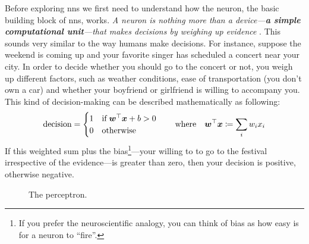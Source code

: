 Before exploring \glspl{nn} we first need to understand how the neuron, the
basic building block of \glspl{nn}, works.  \emph{A neuron is nothing more than
a device---\textbf{a simple computational unit}---that makes decisions by weighing up
evidence} \parencite{Nielsen2018}. This sounds very similar to the way humans
make decisions. For instance, suppose the weekend is coming up and your favorite
singer has scheduled a concert near your city. In order to decide whether you
should go to the concert or not, you weigh up different factors, such as weather
conditions, ease of transportation (you don't own a car) and whether your
boyfriend or girlfriend is willing to accompany you. This kind of
decision-making can be described mathematically as following:
\begin{equation}
	\label{eq:perceptron}
	\text{decision}
	=
	\begin{cases}
		1 \quad \text{if}\; \boldsymbol{w}^\top \boldsymbol{x} + b > 0 \\
		0 \quad \text{otherwise}
	\end{cases}
	\quad
	\text{where}
	\quad
	\boldsymbol{w}^\top\boldsymbol{x} \coloneqq \sum_i w_i x_i
\end{equation}
If this weighted sum plus the bias\footnote{If
you prefer the neuroscientific analogy, you can think of bias as how easy is for
a neuron to ``fire''.}---your willing to to go to the festival
irrespective of the evidence---is greater than zero, then your decision is
positive, otherwise negative.

\begin{figure}
	\centering
	\caption{The perceptron.}
	\label{fig:perceptron}
\end{figure}

